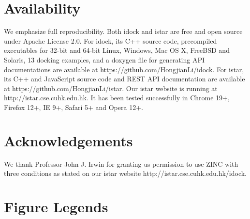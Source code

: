 \documentclass[10pt]{article}
\begin{document}
\section*{Availability}
We emphasize full reproducibility. Both idock and istar are free and open source under Apache License 2.0. For idock, its C++ source code, precompiled executables for 32-bit and 64-bit Linux, Windows, Mac OS X, FreeBSD and Solaris, 13 docking examples, and a doxygen file for generating API documentations are available at https://github.com/HongjianLi/idock. For istar, its C++ and JavaScript source code and REST API documentation are available at https://github.com/HongjianLi/istar. Our istar website is running at http://istar.cse.cuhk.edu.hk. It has been tested successfully in Chrome 19+, Firefox 12+, IE 9+, Safari 5+ and Opera 12+.

\section*{Acknowledgements}
We thank Professor John J. Irwin for granting us permission to use ZINC \cite{532,1178} with three conditions as stated on our istar website http://istar.cse.cuhk.edu.hk/idock.



\section*{Figure Legends}
\end{document}

